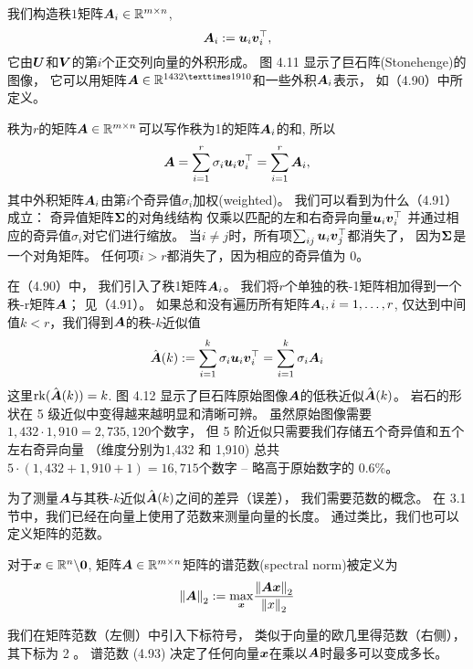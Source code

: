 我们构造秩$1$矩阵$\boldsymbol{A}_i \in \mathbb{R}^{m \times n}$,
\begin{equation}
    \boldsymbol{A}_i := \boldsymbol{u}_i\boldsymbol{v}_i^\top,
\end{equation}
它由$\boldsymbol{U}$和$\boldsymbol{V}$的第$i$个正交列向量的外积形成。
图 4.11 显示了巨石阵(Stonehenge)的图像，
它可以用矩阵$\A \in \R^{1432×1910}$和一些外积$\boldsymbol{A}_i$表示，
如（4.90）中所定义。

秩为$r$的矩阵$\boldsymbol{A} \in \mathbb{R}^{m \times n}$可以写作秩为1的矩阵$\boldsymbol{A}_i$的和, 所以
\begin{equation}
    \boldsymbol{A} =
    \sum_{i=1}^r \sigma_i\boldsymbol{u}_i\boldsymbol{v}_i^\top =
    \sum_{i=1}^r \boldsymbol{A}_i,
\end{equation}
其中外积矩阵$\boldsymbol{A}_i$由第$i$个奇异值$\sigma_i$加权(weighted)。
我们可以看到为什么（4.91）成立：
奇异值矩阵$\boldsymbol{\Sigma}$的对角线结构
仅乘以匹配的左和右奇异向量$\boldsymbol{u}_i\boldsymbol{v}_i^\top$
并通过相应的奇异值$\sigma_i$对它们进行缩放。
当$i \neq j$时，所有项$\sum_{ij}\boldsymbol{u}_i\boldsymbol{v}^\top_j$都消失了，
因为$\boldsymbol{\Sigma}$是一个对角矩阵。
任何项$i > r$都消失了，因为相应的奇异值为 0。

在（4.90）中，
我们引入了秩1矩阵$\boldsymbol{A}_i$。
我们将$r$个单独的秩-1矩阵相加得到一个秩-r矩阵$\boldsymbol{A}$；
见（4.91）。
如果总和没有遍历所有矩阵$\boldsymbol{A}_i,i = 1,\dots,r$,
仅达到中间值$k < r$，我们得到$\boldsymbol{A}$的秩-$k$近似值
\begin{equation}
    \hat{\boldsymbol{A}}(k) :=
    \sum_{i=1}^k \sigma_i\boldsymbol{u}_i\boldsymbol{v}_i^\top =
    \sum_{i=1}^k \sigma_i\boldsymbol{A}_i
\end{equation}
这里$\mathrm{rk}(\hat{\boldsymbol{A}}(k)) = k$.
图 4.12 显示了巨石阵原始图像$\boldsymbol{A}$的低秩近似$\hat{\boldsymbol{A}}(k)$。
岩石的形状在 5 级近似中变得越来越明显和清晰可辨。
虽然原始图像需要$1,432 · 1,910 = 2,735,120$个数字，
但 5 阶近似只需要我们存储五个奇异值和五个左右奇异向量
（维度分别为1,432 和 1,910)
总共$5 · (1,432 + 1,910 + 1) = 16,715$个数字 –
略高于原始数字的 0.6\%。

为了测量$\boldsymbol{A}$与其秩-$k$近似$\hat{\boldsymbol{A}}(k)$之间的差异（误差），
我们需要范数的概念。
在 3.1 节中，我们已经在向量上使用了范数来测量向量的长度。
通过类比，我们也可以定义矩阵的范数。
\begin{definition}[矩阵的谱范数]
对于$\boldsymbol{x} \in \mathbb{R}^n\backslash{\boldsymbol{0}}$,
矩阵$\boldsymbol{A} \in \mathbb{R}^{m \times n}$矩阵的谱范数(spectral norm)被定义为
\begin{equation}
    \left\|\boldsymbol{A}\right\|_2 := \underset{\boldsymbol{x}}{\max} \frac{\left\|\boldsymbol{A}\boldsymbol{x}\right\|_2}{\left\|x\right\|_2}
\end{equation}
\end{definition}
我们在矩阵范数（左侧）中引入下标符号，
类似于向量的欧几里得范数（右侧），其下标为 2 。
谱范数 (4.93) 决定了任何向量$\boldsymbol{x}$在乘以$\boldsymbol{A}$时最多可以变成多长。

